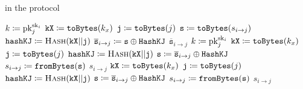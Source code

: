 \begin{algorithm}[t]
\caption{ in the  protocol}
\label{alg:dkg_encryption}
\begin{algorithmic}[1]
    \State $k \coloneqq{} \textrm{pk}{}_{j}^{\textrm{sk}{}_{i}}$
    \State $\texttt{kX} \coloneqq{} \texttt{toBytes}(k_{x})$
    \State $\texttt{j} \coloneqq{} \texttt{toBytes}(j)$
    \State $\texttt{s} \coloneqq{} \texttt{toBytes}(s_{i\to j})$
    \State $\texttt{hashKJ} \coloneqq{} \textsc{Hash}(\texttt{kX}||\texttt{j})$
    \State $\overline{\texttt{s}}_{i\to j} \coloneqq{}
        \texttt{s} \oplus \texttt{HashKJ}$
    \State \Return $\overline{\texttt{s}}_{i\to j}$
\EndProcedure
\State
{}
    \State $k \coloneqq{} \textrm{pk}{}_{j}^{\textrm{sk}{}_{i}}$
    \State $\texttt{kX} \coloneqq{} \texttt{toBytes}(k_{x})$
    \State $\texttt{j} \coloneqq{} \texttt{toBytes}(j)$
    \State $\texttt{hashKJ} \coloneqq{} \textsc{Hash}(\texttt{kX}||\texttt{j})$
    \State $\texttt{s} \coloneqq{}
        \overline{\texttt{s}}_{i\to j} \oplus \texttt{HashKJ}$
    \State $s_{i\to j} \coloneqq{} \texttt{fromBytes}(\texttt{s})$
    \State \Return $s_{i\to j}$
\EndProcedure
\State
{}
    \State $\texttt{kX} \coloneqq{} \texttt{toBytes}(k_{x})$
    \State $\texttt{j} \coloneqq{} \texttt{toBytes}(j)$
    \State $\texttt{hashKJ} \coloneqq{} \textsc{Hash}(\texttt{kX}||\texttt{j})$
    \State $\texttt{s} \coloneqq{}
        \overline{\texttt{s}}_{i\to j} \oplus \texttt{HashKJ}$
    \State $s_{i\to j} \coloneqq{} \texttt{fromBytes}(\texttt{s})$
    \State \Return $s_{i\to j}$
\EndProcedure
\end{algorithmic}
\end{algorithm}
